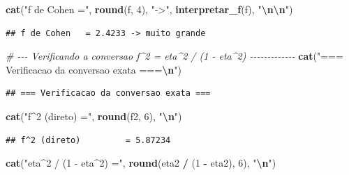 \documentclass[
]{article}
\newenvironment{Shaded}{\begin{snugshade}}{\end{snugshade}}
\newcommand{\CommentTok}[1]{\textcolor[rgb]{0.56,0.35,0.01}{\textit{#1}}}
\newcommand{\DecValTok}[1]{\textcolor[rgb]{0.00,0.00,0.81}{#1}}
\newcommand{\FunctionTok}[1]{\textcolor[rgb]{0.13,0.29,0.53}{\textbf{#1}}}
\newcommand{\NormalTok}[1]{#1}
\newcommand{\SpecialCharTok}[1]{\textcolor[rgb]{0.81,0.36,0.00}{\textbf{#1}}}
\newcommand{\StringTok}[1]{\textcolor[rgb]{0.31,0.60,0.02}{#1}}
\begin{document}
\begin{Shaded}
\begin{Highlighting}[]
\FunctionTok{cat}\NormalTok{(}\StringTok{"f de Cohen   ="}\NormalTok{, }\FunctionTok{round}\NormalTok{(f, }\DecValTok{4}\NormalTok{),    }\StringTok{"{-}\textgreater{}"}\NormalTok{, }\FunctionTok{interpretar\_f}\NormalTok{(f), }\StringTok{"}\SpecialCharTok{\textbackslash{}n\textbackslash{}n}\StringTok{"}\NormalTok{)}
\end{Highlighting}
\end{Shaded}

\begin{verbatim}
## f de Cohen   = 2.4233 -> muito grande
\end{verbatim}

\begin{Shaded}
\begin{Highlighting}[]
\CommentTok{\# {-}{-}{-} Verificando a conversao f\^{}2 = eta\^{}2 / (1 {-} eta\^{}2) {-}{-}{-}{-}{-}{-}{-}{-}{-}{-}{-}{-}{-}}
\FunctionTok{cat}\NormalTok{(}\StringTok{"=== Verificacao da conversao exata ===}\SpecialCharTok{\textbackslash{}n}\StringTok{"}\NormalTok{)}
\end{Highlighting}
\end{Shaded}

\begin{verbatim}
## === Verificacao da conversao exata ===
\end{verbatim}

\begin{Shaded}
\begin{Highlighting}[]
\FunctionTok{cat}\NormalTok{(}\StringTok{"f\^{}2 (direto)         ="}\NormalTok{, }\FunctionTok{round}\NormalTok{(f2, }\DecValTok{6}\NormalTok{), }\StringTok{"}\SpecialCharTok{\textbackslash{}n}\StringTok{"}\NormalTok{)}
\end{Highlighting}
\end{Shaded}

\begin{verbatim}
## f^2 (direto)         = 5.87234
\end{verbatim}

\begin{Shaded}
\begin{Highlighting}[]
\FunctionTok{cat}\NormalTok{(}\StringTok{"eta\^{}2 / (1 {-} eta\^{}2)  ="}\NormalTok{, }\FunctionTok{round}\NormalTok{(eta2 }\SpecialCharTok{/}\NormalTok{ (}\DecValTok{1} \SpecialCharTok{{-}}\NormalTok{ eta2), }\DecValTok{6}\NormalTok{), }\StringTok{"}\SpecialCharTok{\textbackslash{}n}\StringTok{"}\NormalTok{)}
\end{Highlighting}
\end{Shaded}
\end{document}
